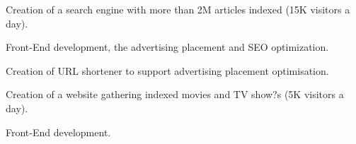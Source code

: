 \documentclass[letterpaper]{my-resume} %
\begin{document}
\begin{minipage}[t]{0.66\textwidth}
\sectionspace %



Creation of a search engine with more than 2M articles indexed (15K visitors a day).
\begin{tightitemize}
\item Front-End development, the advertising placement and SEO optimization.
\item Creation of URL shortener to support advertising placement optimisation.
\end{tightitemize}

\sectionspace %



Creation of a website gathering indexed movies and TV show?s (5K visitors a day).
\begin{tightitemize}
\item Front-End development.
\end{tightitemize}

\sectionspace %

\end{minipage}
\end{document}
